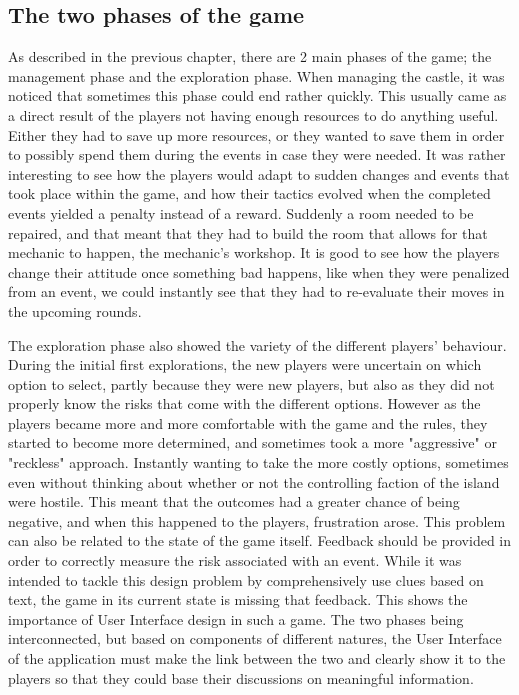 \subsection{The two phases of the game}

As described in the previous chapter, there are 2 main phases of the game; the management phase and the exploration phase. When managing the castle, it was noticed that sometimes this phase could end rather quickly. This usually came as a direct result of the players not having enough resources to do anything useful. Either they had to save up more resources, or they wanted to save them in order to possibly spend them during the events in case they were needed. It was rather interesting to see how the players would adapt to sudden changes and events that took place within the game, and how their tactics evolved when the completed events yielded a penalty instead of a reward. Suddenly a room needed to be repaired, and that meant that they had to build the room that allows for that mechanic to happen, the mechanic's workshop. It is good to see how the players change their attitude once something bad happens, like when they were penalized from an event, we could instantly see that they had to re-evaluate their moves in the upcoming rounds.

The exploration phase also showed the variety of the different players' behaviour. During the initial first explorations, the new players were uncertain on which option to select, partly because they were new players, but also as they did not properly know the risks that come with the different options. However as the players became more and more comfortable with the game and the rules, they started to become more determined, and sometimes took a more "aggressive" or "reckless" approach. Instantly wanting to take the more costly options, sometimes even without thinking about whether or not the controlling faction of the island were hostile. This meant that the outcomes had a greater chance of being negative, and when this happened to the players, frustration arose. This problem can also be related to the state of the game itself. Feedback should be provided in order to correctly measure the risk associated with an event. While it was intended to tackle this design problem by comprehensively use clues based on text, the game in its current state is missing that feedback. This shows the importance of User Interface design in such a game. The two phases being interconnected, but based on components of different natures, the User Interface of the application must make the link between the two and clearly show it to the players so that they could base their discussions on meaningful information.

